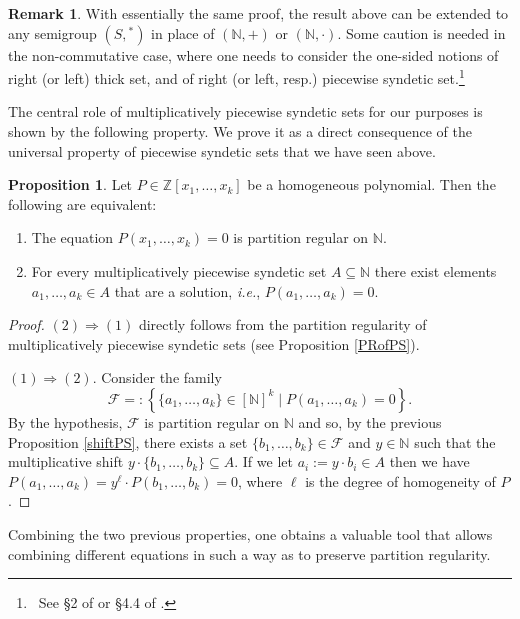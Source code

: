 \documentclass[a4paper,oneside]{article}
\newcommand{\N}{\mathbb{N}}
\newcommand{\F}{\mathcal{F}}
\newcommand{\Z}{\mathbb{Z}}
\renewcommand{\star}{{}^\ast}
\theoremstyle{definition}
\newtheorem{remark}[theorem]{Remark}
\newtheorem{proposition}[theorem]{Proposition}
\theoremstyle{named}
\begin{document}
\begin{remark}
{\rm With essentially the same proof, the result above can be extended
to any semigroup $(S,\star)$ in place of $(\N,+)$ or $(\N,\cdot)$.
Some caution is needed in the non-commutative case,
where one needs to consider the one-sided notions of 
right (or left) thick set, and of right (or left, resp.) piecewise syndetic set.\footnote
{~See \S 2 of \cite{bhm} or \S 4.4 of \cite{hs}.}}
\end{remark}

The central role of multiplicatively piecewise syndetic sets
for our purposes is shown by the following property.
We prove it as a direct consequence of the 
universal property of piecewise syndetic sets that we have seen above.


\begin{proposition}\label{PR-MPS}
Let $P\in\Z[x_1,\ldots,x_k]$ be a homogeneous polynomial. 
Then the following are equivalent:
\begin{enumerate}
\item 
The equation $P(x_1,\ldots,x_k)=0$ is partition regular on $\N$.
\item 
For every multiplicatively piecewise syndetic set $A\subseteq\N$ 
there exist elements $a_1,\ldots,a_k\in A$ that are a solution, \emph{i.e.},
$P(a_1,\ldots,a_k)=0$.
\end{enumerate}
\end{proposition}

\begin{proof} 
$(2)\Rightarrow(1)$ directly follows from the partition regularity
of multiplicatively piecewise syndetic sets (see Proposition \ref{PRofPS}).

\smallskip
$(1)\Rightarrow (2)$. Consider the family
$$\F=:\left\{\{a_1,\ldots,a_k\}\in[\N]^k\mid P(a_1,\ldots,a_k)=0\right\}.$$
By the hypothesis, $\F$ is partition regular on $\N$ and so, by the previous Proposition \ref{shiftPS},
there exists a set $\{b_1,\ldots,b_k\}\in\F$ and $y\in\N$ 
such that the multiplicative shift
$y\cdot\{b_1,\ldots, b_k\}\subseteq A$.
If we let $a_i:=y\cdot b_i\in A$ then we have
$P(a_1,\ldots,a_k)=y^\ell\cdot P(b_1,\ldots,b_k)=0$,
where $\ell$ is the degree of homogeneity of $P$.
\end{proof}

Combining the two previous properties, one
obtains a valuable tool that allows combining different 
equations in such a way as to preserve partition regularity.
\end{document}
